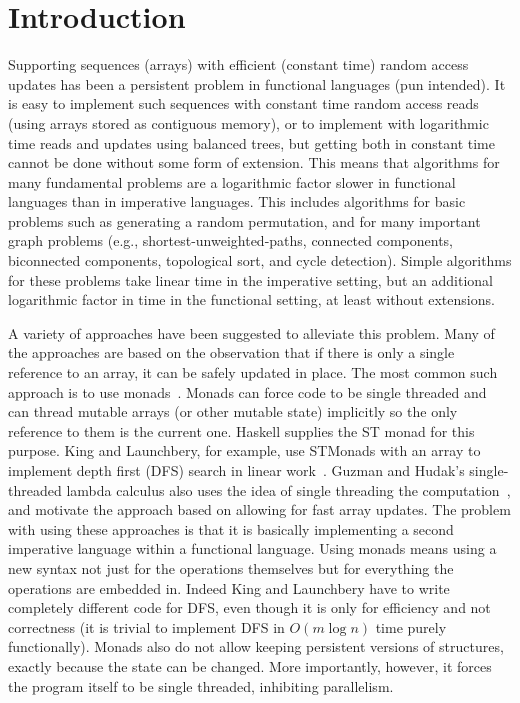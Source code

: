 \section{Introduction}
\label{sec:intro}

Supporting sequences (arrays) with efficient (constant time) random
access updates has been a persistent problem in functional languages
(pun intended).  It is easy to implement such sequences with constant
time random access reads (using arrays stored as contiguous memory),
or to implement with logarithmic time reads and updates using balanced
trees, but getting both in constant time cannot be done without some
form of extension.
This means that algorithms
for many fundamental problems are a logarithmic factor slower in
functional languages than in imperative languages.  This includes
algorithms for basic problems such as generating a random permutation,
and for many important graph problems (e.g.,
shortest-unweighted-paths, connected components, biconnected
components, topological sort, and cycle detection).  Simple algorithms
for these problems take linear time in the imperative setting, but an
additional logarithmic factor in time in the functional setting, at
least without extensions.

A variety of approaches have been suggested to alleviate this problem.
Many of the approaches are based on the observation that if there is
only a single reference to an array, it can be safely updated in
place.  The most common such approach is to use
monads~\cite{Moggi89,Wadler95}.  Monads can force code to be single
threaded and can thread mutable arrays (or other mutable
state) implicitly so the only reference to them is the current one.
Haskell supplies the ST monad for this purpose.  King and Launchbery,
for example, use STMonads with an array to implement depth first (DFS)
search in linear work~\cite{KL95}.  Guzman and Hudak's single-threaded
lambda calculus also uses the idea of single threading the
computation~\cite{GH90}, and motivate the approach based on allowing
for fast array updates.  The problem with using these approaches is
that it is basically implementing a second imperative language within
a functional language.  Using monads means using a new syntax not just
for the operations themselves but for everything the operations are
embedded in.  Indeed King and Launchbery have to write completely
different code for DFS, even though it is only for efficiency and not
correctness (it is trivial to implement DFS in $O(m \log n)$ time
purely functionally).  Monads also do not allow keeping persistent
versions of structures, exactly because the state can be changed.
More importantly, however, it forces the program itself to be single
threaded, inhibiting parallelism.

